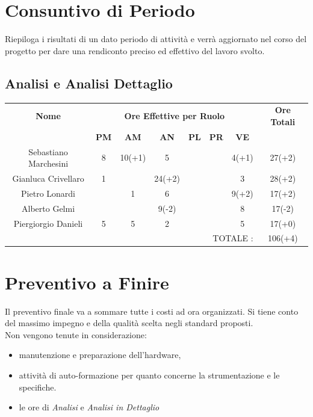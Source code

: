 \documentclass[12pt,a4paper,titlepage]{article}
\begin{document}
\newpage

\section{Consuntivo di Periodo}
Riepiloga i risultati di un dato periodo di attività e verrà aggiornato nel corso del progetto per dare una rendiconto preciso ed effettivo del lavoro svolto. \\
\subsection{Analisi e Analisi Dettaglio}

{\renewcommand\arraystretch{1.2}  %
	\begin{tabular}{|c|c|c|c|c|c|c|c|}
		\hline 
		\textbf{Nome} & \multicolumn{6}{c|}{\textbf{Ore Effettive per Ruolo}} & \textbf{Ore Totali} \\ 
		& \textbf{PM} & \textbf{AM} & \textbf{AN} & \textbf{PL} & \textbf{PR} & \textbf{VE} & \\ 
		\hline
		Sebastiano Marchesini & 8 & 10(+1) & 5 &  &  & 4(+1) & 27(+2) \\ 
		\hline 
		Gianluca Crivellaro & 1 &  & 24(+2) &  &  & 3 & 28(+2) \\ 
		\hline 
		Pietro Lonardi &  & 1 & 6 &  &  & 9(+2) & 17(+2) \\ 
		\hline 
		Alberto Gelmi &  &  & 9(-2) &  &  & 8 & 17(-2) \\ 
		\hline 
		Piergiorgio Danieli & 5 & 5 & 2 &  &  & 5 & 17(+0) \\ 
		\hline 
		\multicolumn{7}{r|}{TOTALE  :} & 106(+4) \\ 
\end{tabular}} 


\newpage

\section{Preventivo a Finire}
Il preventivo finale va a sommare tutte i costi ad ora organizzati. Si tiene conto del massimo impegno e della qualità scelta negli standard proposti. \\
Non vengono tenute in considerazione:
\begin{itemize}
	\item manutenzione e preparazione dell'hardware,
	\item attività di auto-formazione per quanto concerne la strumentazione e le specifiche.
	\item le ore di \textit{Analisi} e \textit{Analisi in Dettaglio}
\end{itemize}
\end{document}
